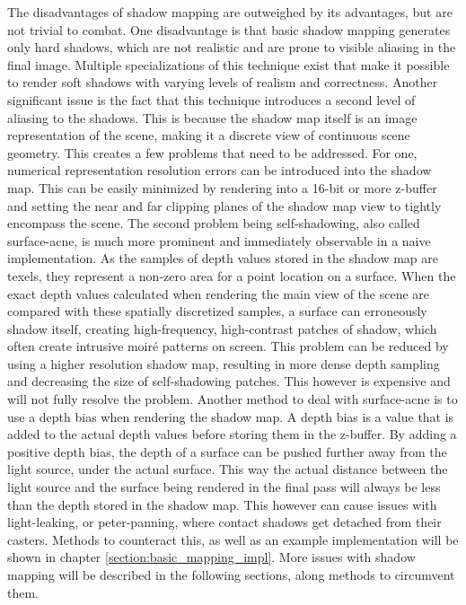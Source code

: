 The disadvantages of shadow mapping are outweighed by its advantages, but are not trivial to combat. One disadvantage is that basic shadow mapping generates only hard shadows, which are not realistic and are prone to visible aliasing in the final image. Multiple specializations of this technique exist that make it possible to render soft shadows with varying levels of realism and correctness. Another significant issue is the fact that this technique introduces a second level of aliasing to the shadows. This is because the shadow map itself is an image representation of the scene, making it a discrete view of continuous scene geometry. This creates a few problems that need to be addressed. For one, numerical representation resolution errors can be introduced into the shadow map. This can be easily minimized by rendering into a 16-bit or more z-buffer and setting the near and far clipping planes of the shadow map view to tightly encompass the scene. The second problem being self-shadowing, also called surface-acne, is much more prominent and immediately observable in a naive implementation. As the samples of depth values stored in the shadow map are texels, they represent a non-zero area for a point location on a surface. When the exact depth values calculated when rendering the main view of the scene are compared with these spatially discretized samples, a surface can erroneously shadow itself, creating high-frequency, high-contrast patches of shadow, which often create intrusive moiré patterns on screen. This problem can be reduced by using a higher resolution shadow map, resulting in more dense depth sampling and decreasing the size of self-shadowing patches. This however is expensive and will not fully resolve the problem. Another method to deal with surface-acne is to use a depth bias when rendering the shadow map. A depth bias is a value that is added to the actual depth values before storing them in the z-buffer. By adding a positive depth bias, the depth of a surface can be pushed further away from the light source, under the actual surface. This way the actual distance between the light source and the surface being rendered in the final pass will always be less than the depth stored in the shadow map. This however can cause issues with light-leaking, or peter-panning, where contact shadows get detached from their casters. Methods to counteract this, as well as an example implementation will be shown in chapter \ref{section:basic_mapping_impl}. More issues with shadow mapping will be described in the following sections, along methods to circumvent them.

